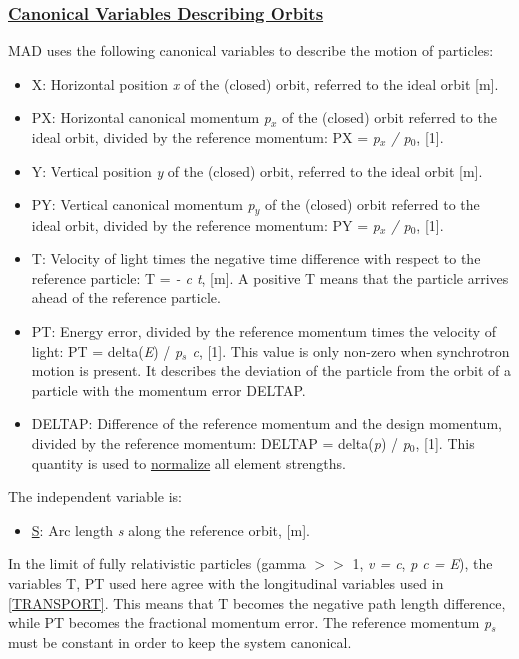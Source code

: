 \subsubsection{\href{canon}{Canonical Variables Describing Orbits}} MAD uses the following canonical variables to describe the motion of particles: 
\begin{itemize}
	\item X: Horizontal position \textit{x} of the (closed) orbit, referred to the ideal orbit [m].   
	\item PX: Horizontal canonical momentum \textit{p$_x$} of the (closed) orbit referred to the ideal orbit, divided by the reference momentum: PX = \textit{p$_x$ / p$_0$}, [1].   
	\item Y: Vertical position \textit{y} of the (closed) orbit, referred to the ideal orbit [m].   
	\item PY: Vertical canonical momentum \textit{p$_y$} of the (closed) orbit referred to the ideal orbit, divided by the reference momentum: PY = \textit{p$_x$ / p$_0$}, [1].   
	\item T: Velocity of light times the negative time difference with respect to the reference particle: T = \textit{ - c t}, [m]. A positive T means that the particle arrives ahead of the reference particle.   
	\item PT: Energy error, divided by the reference momentum times the velocity of light: PT = delta(\textit{E}) / \textit{p$_s$ c}, [1]. This value is only non-zero when synchrotron motion is present. It describes the deviation of the particle from the orbit of a particle with the momentum error DELTAP.   
	\item DELTAP: Difference of the reference momentum and the design momentum, divided by the reference momentum: DELTAP = delta(\textit{p}) / \textit{p$_0$}, [1]. This quantity is used to \href{defects.html}{normalize} all element strengths.   
\end{itemize} The independent variable is: 
\begin{itemize}
	\item \href{s}{S}: Arc length \textit{s} along the reference orbit, [m].   
\end{itemize} In the limit of fully relativistic particles (gamma $>$$>$ 1, \textit{v = c}, \textit{p c = E}), the variables T, PT used here agree with the longitudinal variables used in \href{bibliography.html#transport}{[TRANSPORT]}. This means that T becomes the negative path length difference, while PT becomes the fractional momentum error. The reference momentum \textit{p$_s$} must be constant in order to keep the system canonical. 

